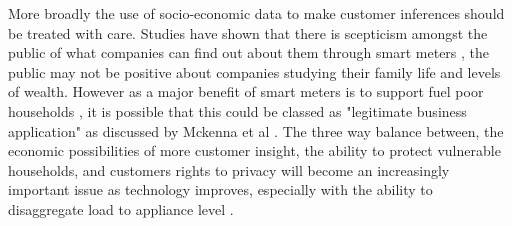 More broadly the use of socio-economic data to make customer inferences should be treated with care. Studies have shown that there is scepticism amongst the public of what companies can find out about them through smart meters \cite{buchanan2016}, the public may not be positive about companies studying their family life and levels of wealth. However as a major benefit of smart meters is to support fuel poor households \cite{clastres2016}, it is possible that this could be classed as "legitimate business application" as discussed by Mckenna et al \cite{mckenna2012}. The three way balance between, the economic possibilities of more customer insight, the ability to protect vulnerable households, and customers rights to privacy will become an increasingly important issue as technology improves, especially with the ability to disaggregate load to appliance level \cite{kavousian2013} \cite{weiss}.


